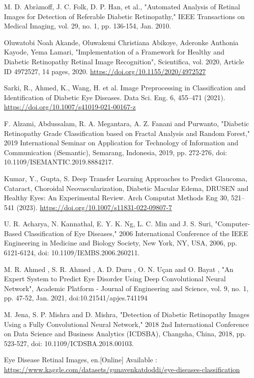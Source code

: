 \documentclass[conference]{IEEEtran}
\begin{document}
\begin{thebibliography}{00}
 M. D. Abràmoff, J. C. Folk, D. P. Han, et al., "Automated Analysis of Retinal Images for Detection of Referable Diabetic Retinopathy," IEEE Transactions on Medical Imaging, vol. 29, no. 1, pp. 136-154, Jan. 2010.

\vspace{5pt}
 Oluwatobi Noah Akande, Oluwakemi Christiana Abikoye, Aderonke Anthonia Kayode, Yema Lamari, "Implementation of a Framework for Healthy and Diabetic Retinopathy Retinal Image Recognition", Scientifica, vol. 2020, Article ID 4972527, 14 pages, 2020. \url{https://doi.org/10.1155/2020/4972527}

\vspace{5pt}
 Sarki, R., Ahmed, K., Wang, H. et al. Image Preprocessing in Classification and Identification of Diabetic Eye Diseases. Data Sci. Eng. 6, 455–471 (2021). \url{https://doi.org/10.1007/s41019-021-00167-z}

\vspace{5pt}
 F. Alzami, Abdussalam, R. A. Megantara, A. Z. Fanani and Purwanto, "Diabetic Retinopathy Grade Classification based on Fractal Analysis and Random Forest," 2019 International Seminar on Application for Technology of Information and Communication (iSemantic), Semarang, Indonesia, 2019, pp. 272-276, doi: 10.1109/ISEMANTIC.2019.8884217.

\vspace{5pt}
 Kumar, Y., Gupta, S. Deep Transfer Learning Approaches to Predict Glaucoma, Cataract, Choroidal Neovascularization, Diabetic Macular Edema, DRUSEN and Healthy Eyes: An Experimental Review. Arch Computat Methods Eng 30, 521–541 (2023). \url{https://doi.org/10.1007/s11831-022-09807-7} 

\vspace{5pt}
U. R. Acharya, N. Kannathal, E. Y. K. Ng, L. C. Min and J. S. Suri, "Computer-Based Classification of Eye Diseases," 2006 International Conference of the IEEE Engineering in Medicine and Biology Society, New York, NY, USA, 2006, pp. 6121-6124, doi: 10.1109/IEMBS.2006.260211.

\vspace{5pt}
M. R. Ahmed , S. R. Ahmed , A. D. Duru , O. N. Uçan and O. Bayat , "An Expert System to Predict Eye Disorder Using Deep Convolutional Neural Network", Academic Platform - Journal of Engineering and Science, vol. 9, no. 1, pp. 47-52, Jan. 2021, doi:10.21541/apjes.741194

\vspace{5pt}
 M. Jena, S. P. Mishra and D. Mishra, "Detection of Diabetic Retinopathy Images Using a Fully Convolutional Neural Network," 2018 2nd International Conference on Data Science and Business Analytics (ICDSBA), Changsha, China, 2018, pp. 523-527, doi: 10.1109/ICDSBA.2018.00103.

\vspace{5pt}
 Eye Disease Retinal Images, en.[Online] Available : \url{https://www.kaggle.com/datasets/gunavenkatdoddi/eye-diseases-classification}


\end{thebibliography}
\end{document}
